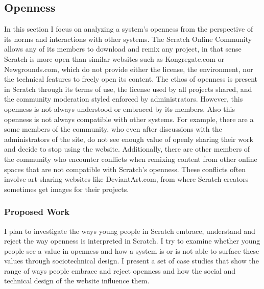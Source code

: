 \subsection{Openness}
In this section I focus on analyzing a system's openness from the perspective of its norms and interactions with other systems.
The Scratch Online Community allows any of its members to download and remix any project, in that sense Scratch is more open than similar websites such as Kongregate.com or Newgrounds.com, which do not provide either the license, the environment, nor the technical features to freely open its content. 
The ethos of openness is present in Scratch through its terms of use, the license used by all projects shared, and the community moderation styled enforced by administrators.
However, this openness is not always understood or embraced by its members.
Also this openness is not always compatible with other systems.
For example, there are a some members of the community, who even after discussions with the administrators of the site, do not see enough value of openly sharing their work and decide to stop using the website. 
Additionally, there are other members of the community who encounter conflicts when remixing content from other online spaces that are not compatible with Scratch's openness. 
These conflicts often involve art-sharing websites like DeviantArt.com, from where Scratch creators sometimes get images for their projects.

\subsubsection{Proposed Work}
I plan to investigate the ways young people in Scratch embrace, understand and reject the way openness is interpreted in Scratch.
I try to examine whether young people see a value in openness and how a system is or is not able to surface these values through sociotechnical design.
I present a set of case studies that show the range of ways people embrace and reject openness and how the social and technical design of the website influence them. 

